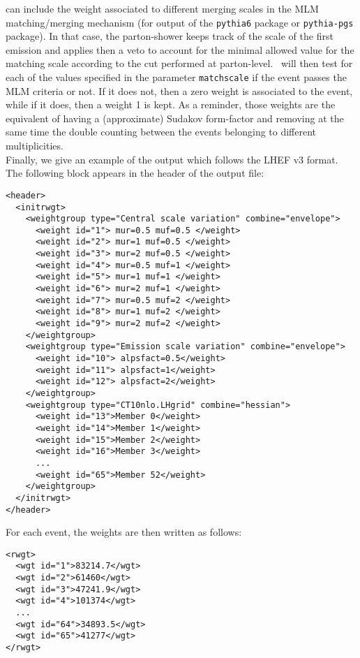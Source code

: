 \syscalc can include the weight associated to different merging scales in the MLM matching/merging mechanism (for output of the \texttt{pythia6} package or \texttt{pythia-pgs} package). In that case, the parton-shower keeps track of the scale of the first emission and applies then a veto to account for the minimal allowed value for the matching scale according to the cut performed at parton-level. \syscalc\ will then test for each of the values specified in the parameter \texttt{matchscale} if the event passes the MLM criteria or not. If it does not, then a zero weight is associated to the event, while if it does, then a weight 1 is kept. As a reminder,  those weights are the equivalent of having a (approximate) Sudakov form-factor and removing at the same time the double counting between the events belonging to different multiplicities.\\

Finally, we give an example of the \syscalc output which follows the LHEF v3 format. The following block appears in the header of the output file:

\footnotesize{
\begin{verbatim}
<header>
  <initrwgt>
    <weightgroup type="Central scale variation" combine="envelope">
      <weight id="1"> mur=0.5 muf=0.5 </weight>
      <weight id="2"> mur=1 muf=0.5 </weight>
      <weight id="3"> mur=2 muf=0.5 </weight>
      <weight id="4"> mur=0.5 muf=1 </weight>
      <weight id="5"> mur=1 muf=1 </weight>
      <weight id="6"> mur=2 muf=1 </weight>
      <weight id="7"> mur=0.5 muf=2 </weight>
      <weight id="8"> mur=1 muf=2 </weight>
      <weight id="9"> mur=2 muf=2 </weight>
    </weightgroup>
    <weightgroup type="Emission scale variation" combine="envelope">
      <weight id="10"> alpsfact=0.5</weight>
      <weight id="11"> alpsfact=1</weight>
      <weight id="12"> alpsfact=2</weight>
    </weightgroup>
    <weightgroup type="CT10nlo.LHgrid" combine="hessian">
      <weight id="13">Member 0</weight>
      <weight id="14">Member 1</weight>
      <weight id="15">Member 2</weight>
      <weight id="16">Member 3</weight>
      ...
      <weight id="65">Member 52</weight>
    </weightgroup>
  </initrwgt>
</header>
\end{verbatim}}

\noindent For each event, the weights are then written as follows:
\footnotesize{
\begin{verbatim}
<rwgt>
  <wgt id="1">83214.7</wgt>
  <wgt id="2">61460</wgt>
  <wgt id="3">47241.9</wgt>
  <wgt id="4">101374</wgt>
  ...
  <wgt id="64">34893.5</wgt>
  <wgt id="65">41277</wgt>
</rwgt>
\end{verbatim}}
\normalsize


